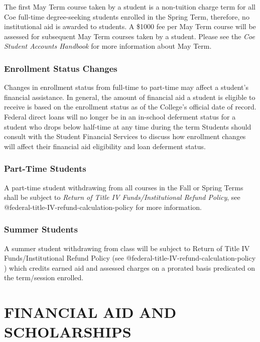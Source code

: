 \documentclass[
  letterpaper,
]{scrbook}
\begin{document}
The first May Term course taken by a student is a non-tuition charge
term for all Coe full-time degree-seeking students enrolled in the
Spring Term, therefore, no institutional aid is awarded to students. A
\$1000 fee per May Term course will be assessed for subsequent May Term
courses taken by a student. Please see the \emph{Coe Student Accounts
Handbook} for more information about May Term.

\hypertarget{enrollment-status-changes}{%
\subsection{Enrollment Status Changes}\label{enrollment-status-changes}}

Changes in enrollment status from full-time to part-time may affect a
student's financial assistance. In general, the amount of financial aid
a student is eligible to receive is based on the enrollment status as of
the College's official date of record. Federal direct loans will no
longer be in an in-school deferment status for a student who drops below
half-time at any time during the term Students should consult with the
Student Financial Services to discuss how enrollment changes will affect
their financial aid eligibility and loan deferment status.

\hypertarget{part-time-students}{%
\subsection{Part-Time Students}\label{part-time-students}}

A part-time student withdrawing from all courses in the Fall or Spring
Terms shall be subject to \emph{Return of Title IV Funds/Institutional
Refund Policy}, see @federal-title-IV-refund-calculation-policy for more
information.

\hypertarget{summer-students}{%
\subsection{Summer Students}\label{summer-students}}

A summer student withdrawing from class will be subject to Return of
Title IV Funds/Institutional Refund Policy (see
@federal-title-IV-refund-calculation-policy ) which credits earned aid
and assessed charges on a prorated basis predicated on the term/session
enrolled.

\hypertarget{financial-aid-and-scholarships}{%
\chapter{FINANCIAL AID AND
SCHOLARSHIPS}\label{financial-aid-and-scholarships}}
\end{document}
